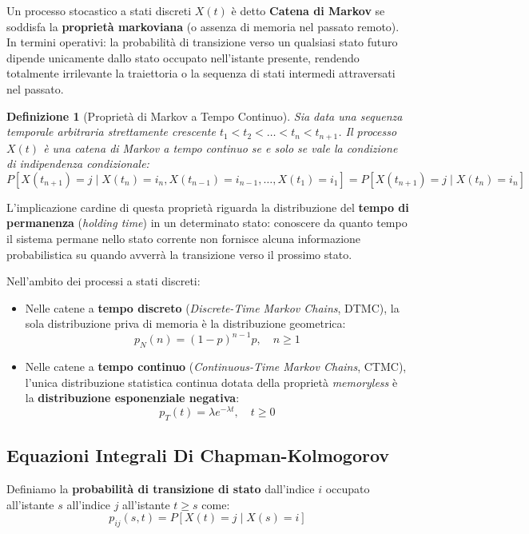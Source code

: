 \documentclass[11pt, a4paper]{article}
\newtheorem{theorem}{Definizione}
\begin{document}
Un processo stocastico a stati discreti $X(t)$ è detto \textbf{Catena di Markov} se soddisfa la \textbf{proprietà markoviana} (o assenza di memoria nel passato remoto). In termini operativi: la probabilità di transizione verso un qualsiasi stato futuro dipende unicamente dallo stato occupato nell'istante presente, rendendo totalmente irrilevante la traiettoria o la sequenza di stati intermedi attraversati nel passato.

\begin{theorem}[Proprietà di Markov a Tempo Continuo]
Sia data una sequenza temporale arbitraria strettamente crescente $t_1 < t_2 < \dots < t_n < t_{n+1}$. Il processo $X(t)$ è una catena di Markov a tempo continuo se e solo se vale la condizione di indipendenza condizionale:
\[
    \boxed{P[X(t_{n+1}) = j \mid X(t_n) = i_n, X(t_{n-1}) = i_{n-1}, \dots, X(t_1) = i_1] = P[X(t_{n+1}) = j \mid X(t_n) = i_n]}
\]
\end{theorem}

L'implicazione cardine di questa proprietà riguarda la distribuzione del \textbf{tempo di permanenza} (\emph{holding time}) in un determinato stato: conoscere da quanto tempo il sistema permane nello stato corrente non fornisce alcuna informazione probabilistica su quando avverrà la transizione verso il prossimo stato.

Nell'ambito dei processi a stati discreti:
\begin{itemize}[leftmargin=*]
    \item Nelle catene a \textbf{tempo discreto} (\emph{Discrete-Time Markov Chains}, DTMC), la sola distribuzione priva di memoria è la distribuzione geometrica:
    \[
        p_N(n) = (1 - p)^{n-1} p, \quad n \ge 1
    \]
    \item Nelle catene a \textbf{tempo continuo} (\emph{Continuous-Time Markov Chains}, CTMC), l'unica distribuzione statistica continua dotata della proprietà \emph{memoryless} è la \textbf{distribuzione esponenziale negativa}:
    \[
        p_T(t) = \lambda e^{-\lambda t}, \quad t \ge 0
    \]
\end{itemize}

\subsection{Equazioni Integrali Di Chapman-Kolmogorov}

Definiamo la \textbf{probabilità di transizione di stato} dall'indice $i$ occupato all'istante $s$ all'indice $j$ all'istante $t \ge s$ come:
\[
    p_{ij}(s, t) = P[X(t) = j \mid X(s) = i]
\]
\end{document}
